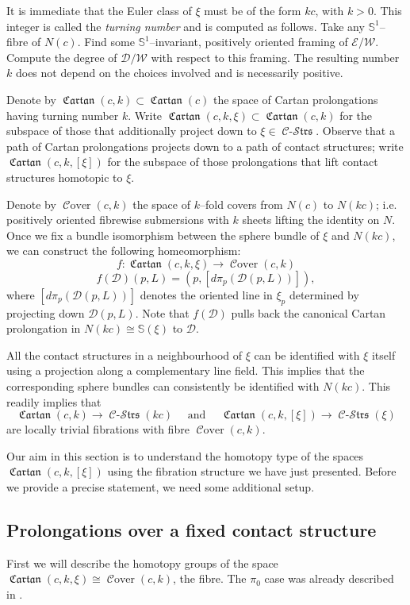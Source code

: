 \documentclass[10pt]{amsart}
\newcommand{\SE}{{\mathcal{E}}}
\newcommand{\SD}{{\mathcal{D}}}
\newcommand{\SW}{{\mathcal{W}}}
\newcommand{\Cover}{\operatorname{\mathcal{C}over}}
\newcommand{\Cartan}{\operatorname{\mathfrak{Cartan}}}
\newcommand{\Cont}{\operatorname{\mathcal{C}-\mathcal{S}\mathfrak{trs}}}
\newcommand{\NS}{{\mathbb{S}}}
\theoremstyle{definition}
\begin{document}
It is immediate that the Euler class of $\xi$ must be of the form $kc$, with $k>0$. This integer is called the \textsl{turning number} and is computed as follows. Take any $\NS^1$--fibre of $N(c)$. Find some $\NS^1$--invariant, positively oriented framing of $\SE/\SW$. Compute the degree of $\SD/\SW$ with respect to this framing. The resulting number $k$ does not depend on the choices involved and is necessarily positive.

Denote by $\Cartan(c,k) \subset \Cartan(c)$ the space of Cartan prolongations having turning number $k$. Write $\Cartan(c,k,\xi) \subset \Cartan(c,k)$ for the subspace of those that additionally project down to $\xi \in \Cont$. Observe that a path of Cartan prolongations projects down to a path of contact structures; write $\Cartan(c,k,[\xi])$ for the subspace of those prolongations that lift contact structures homotopic to $\xi$.

Denote by $\Cover(c,k)$ the space of $k$--fold covers from $N(c)$ to $N(kc)$; i.e. positively oriented fibrewise submersions with $k$ sheets lifting the identity on $N$. Once we fix a bundle isomorphism between the sphere bundle of $\xi$ and $N(kc)$, we can construct the following homeomorphism:
\[ f: \Cartan(c,k,\xi) \to \Cover(c,k) \]
\[ f(\SD)(p,L) = (p,[d\pi_p(\SD(p,L))]), \]
where $[d\pi_p(\SD(p,L))]$ denotes the oriented line in $\xi_p$ determined by projecting down $\SD(p,L)$. Note that $f(\SD)$ pulls back the canonical Cartan prolongation in $N(kc) \cong \NS(\xi)$ to $\SD$.

All the contact structures in a neighbourhood of $\xi$ can be identified with $\xi$ itself using a projection along a complementary line field. This implies that the corresponding sphere bundles can consistently be identified with $N(kc)$. This readily implies that 
\[ \Cartan(c,k) \to \Cont(kc) \quad \text{ and } \quad  \Cartan(c,k,[\xi]) \to \Cont(\xi) \]
are locally trivial fibrations with fibre $\Cover(c,k)$. 

Our aim in this section is to understand the homotopy type of the spaces $\Cartan(c,k,[\xi])$ using the fibration structure we have just presented. Before we provide a precise statement, we need some additional setup.


\subsection{Prolongations over a fixed contact structure} \label{ssec:Cartan}

First we will describe the homotopy groups of the space $\Cartan(c,k,\xi) \cong \Cover(c,k)$, the fibre. The $\pi_0$ case was already described in \cite{KS}.
\end{document}
